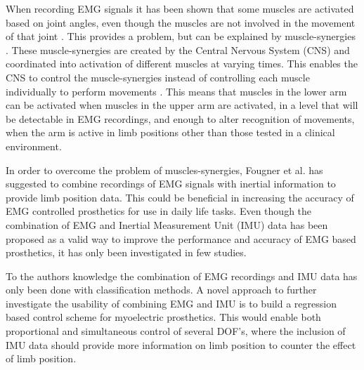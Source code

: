 When recording EMG signals it has been shown that some muscles are activated based on joint angles, even though the muscles are not involved in the movement of that joint \cite{Fougner2011}. This provides a problem, but can be explained by muscle-synergies \cite{DeRugy2013}. These muscle-synergies are created by the Central Nervous System (CNS) and coordinated into activation of different muscles at varying times. This enables the CNS to control the muscle-synergies instead of controlling each muscle individually to perform movements \cite{jiang2009}. This means that muscles in the lower arm can be activated when muscles in the upper arm are activated, in a level that will be detectable in EMG recordings, and enough to alter recognition of movements, when the arm is active in limb positions other than those tested in a clinical environment. 

In order to overcome the problem of muscles-synergies, Fougner et al. \cite{Fougner2011} has suggested to combine recordings of EMG signals with inertial information to provide limb position data. This could be beneficial in increasing the accuracy of EMG controlled prosthetics for use in daily life tasks. 
Even though the combination of EMG and Inertial Measurement Unit (IMU) data has been proposed as a valid way to improve the performance and accuracy of EMG based prosthetics, it has only been investigated in few studies. \cite{Roy2010, Imtiaz2014, jiang2012}

To the authors knowledge the combination of EMG recordings and IMU data has only been done with classification methods. A novel approach to further investigate the usability of combining EMG and IMU is to build a regression based control scheme for myoelectric prosthetics. This would enable both proportional and simultaneous control of several DOF's, where the inclusion of IMU data should provide more information on limb position to counter the effect of limb position.






